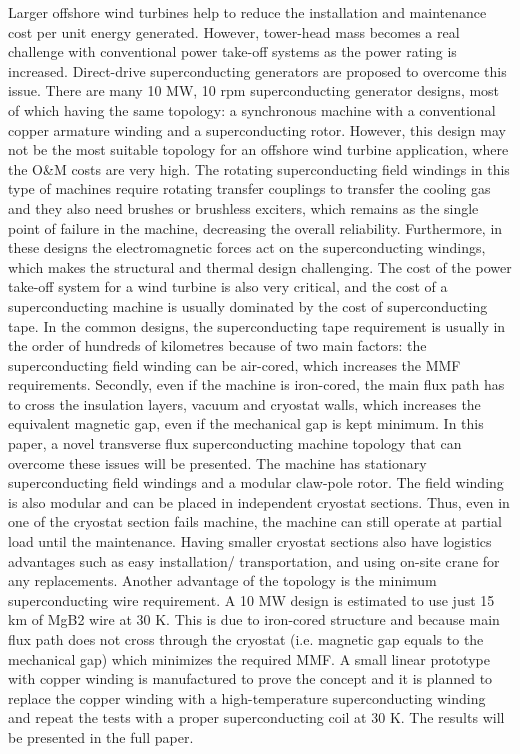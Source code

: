 \documentclass[12pt]{IET02}
\begin{document}
Larger offshore wind turbines help to reduce the installation and maintenance cost per unit energy generated. However, tower-head mass becomes a real challenge with conventional power take-off systems as the power rating is increased. Direct-drive superconducting generators are proposed to overcome this issue. There are many 10 MW, 10 rpm superconducting generator designs, most of which having the same topology: a synchronous machine with a conventional copper armature winding and a superconducting rotor. However, this design may not be the most suitable topology for an offshore wind turbine application, where the O&M costs are very high. 
The rotating superconducting field windings in this type of machines require rotating transfer couplings to transfer the cooling gas and they also need brushes or brushless exciters, which remains as the single point of failure in the machine, decreasing the overall reliability. Furthermore, in these designs the electromagnetic forces act on the superconducting windings, which makes the structural and thermal design challenging.
The cost of the power take-off system for a wind turbine is also very critical, and the cost of a superconducting machine is usually dominated by the cost of superconducting tape. In the common designs, the superconducting tape requirement is usually in the order of hundreds of kilometres because of two main factors: the superconducting field winding can be air-cored, which increases the MMF requirements. Secondly, even if the machine is iron-cored, the main flux path has to cross the insulation layers, vacuum and cryostat walls, which increases the equivalent magnetic gap, even if the mechanical gap is kept minimum.
In this paper, a novel transverse flux superconducting machine topology that can overcome these issues will be presented. The machine has stationary superconducting field windings and a modular claw-pole rotor. The field winding is also modular and can be placed in independent cryostat sections. Thus, even in one of the cryostat section fails machine, the machine can still operate at partial load until the maintenance. Having smaller cryostat sections also have logistics advantages such as easy installation/ transportation, and using on-site crane for any replacements. Another advantage of the topology is the minimum superconducting wire requirement. A 10 MW design is estimated to use just 15 km of MgB2 wire at 30 K. This is due to iron-cored structure and because main flux path does not cross through the cryostat (i.e. magnetic gap equals to the mechanical gap) which minimizes the required MMF.
A small linear prototype with copper winding is manufactured to prove the concept and it is planned to replace the copper winding with a high-temperature superconducting winding and repeat the tests with a proper superconducting coil at 30 K. The results will be presented in the full paper.
\end{document}
